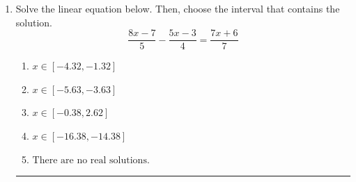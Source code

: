 \documentclass[14pt]{extbook}
\newcommand{\litem}[1]{\item#1\hspace*{-1cm}\rule{\textwidth}{0.4pt}}
\begin{document}
\begin{enumerate}
{\begin{enumerate}[label=\Alph*.]
\end{enumerate} }
\litem{
Solve the linear equation below. Then, choose the interval that contains the solution.\[ \frac{8x -7}{5} - \frac{5x -3}{4} = \frac{7x + 6}{7} \]\begin{enumerate}[label=\Alph*.]
\item \( x \in [-4.32, -1.32] \)
\item \( x \in [-5.63, -3.63] \)
\item \( x \in [-0.38, 2.62] \)
\item \( x \in [-16.38, -14.38] \)
\item \( \text{There are no real solutions.} \)

\end{enumerate} }
\end{enumerate}
\end{document}
